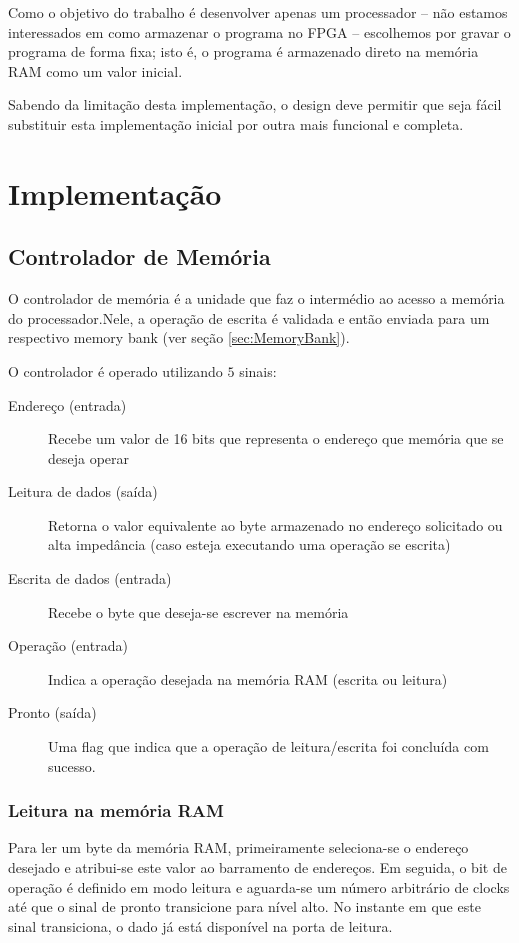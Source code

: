 \documentclass[11pt]{report}
\begin{document}
Como o objetivo do trabalho é desenvolver apenas um processador -- não estamos interessados em como armazenar o programa no FPGA -- escolhemos por gravar o programa de forma fixa; isto é, o programa é armazenado direto na memória RAM como um valor inicial.

Sabendo da limitação desta implementação, o design deve permitir que seja fácil substituir esta implementação inicial por outra mais funcional e completa.

\chapter{Implementação}

\section{Controlador de Memória}
\label{sec:MemoryController}
O controlador de memória é a unidade que faz o intermédio ao acesso a memória do processador.Nele, a operação de escrita é validada e então enviada para um respectivo memory bank (ver seção \ref{sec:MemoryBank}).

O controlador é operado utilizando $5$ sinais:

\begin{description}
	\item[Endereço (entrada)] Recebe um valor de 16 bits que representa o endereço que memória que se deseja operar
	\item[Leitura de dados (saída)] Retorna o valor equivalente ao byte armazenado no endereço solicitado ou alta impedância (caso esteja executando uma operação se escrita)
	\item[Escrita de dados (entrada)] Recebe o byte que deseja-se escrever na memória
	\item[Operação (entrada)] Indica a operação desejada na memória RAM (escrita ou leitura)
	\item[Pronto (saída)] Uma flag que indica que a operação de leitura/escrita foi concluída com sucesso.
\end{description}

\subsection{Leitura na memória RAM}
\label{MemoryRead}
Para ler um byte da memória RAM, primeiramente seleciona-se o endereço desejado e atribui-se este valor ao barramento de endereços. Em seguida, o bit de operação é definido em modo leitura e aguarda-se um número arbitrário de clocks até que o sinal de pronto transicione para nível alto. No instante em que este sinal transiciona, o dado já está disponível na porta de leitura.
\end{document}
